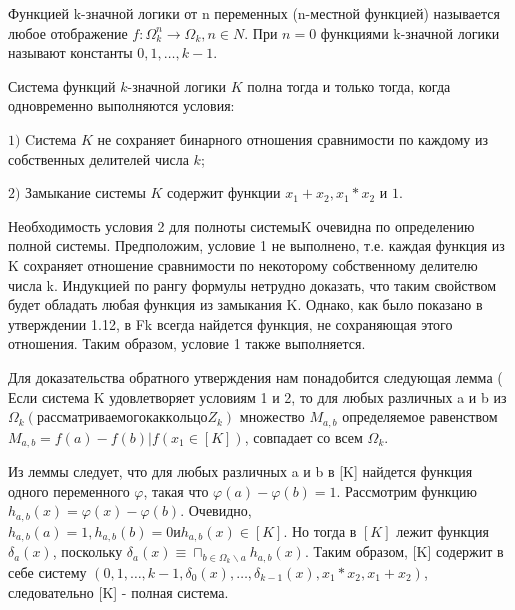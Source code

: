 \begin{defs}
Функцией k-значной логики от n переменных (n-местной функцией) называется любое отображение $f : \Omega_{k}^{n} \rightarrow  \Omega_{k}, n \in N $. При $n =0$ функциями k-значной логики называют константы $0,1,\ldots, k-1 $.
\end{defs}

\begin{proofs}[А. А. Нечаев]
Система функций $k$-значной логики $K$ полна тогда и только тогда, когда одновременно выполняются условия:

$1)$  Cистема $K$ не сохраняет бинарного отношения сравнимости по каждому из собственных делителей числа $k$;

$2)$ Замыкание системы $K$ содержит функции $x_{1} + x_{2}, x_{1}  * x_{2}$ и $1$.
	\begin{dokvo}
		 Необходимость условия 2 для полноты системыK очевидна по определению полной системы. Предположим, условие 1 не выполнено, т.е. каждая функция из K сохраняет отношение сравнимости по некоторому собственному делителю числа k. Индукцией по рангу формулы нетрудно доказать, что таким свойством будет обладать любая функция из замыкания K. Однако, как было показано в утверждении 1.12, в Fk всегда найдется функция, не сохраняющая этого отношения. Таким образом, условие 1 также выполняется.

		Для доказательства обратного утверждения нам понадобится следующая лемма ( Если система K удовлетворяет условиям 1 и 2, то для любых различных a и b из $\Omega_{k}  (рассматриваемого как кольцо Z_{k})$  множество $M_{a,b}$ определяемое равенством $ M_{a,b} = { f(a) - f(b) | f(x_{1} \in [K])}$, совпадает со всем $\Omega_{k}$.

		Из леммы следует, что для любых различных a и b в [K] найдется функция одного переменного $\varphi$, такая что $\varphi(a) - \varphi (b) = 1$.  Рассмотрим функцию $h_{a,b}(x) = \varphi(x) - \varphi(b)$. Очевидно, $h_{a,b}(a) = 1, h_{a,b}(b) = 0 и h_{a,b}(x) \in [K]$.  Но тогда в $[K]$ лежит функция $\delta_{a}(x)$,   поскольку $\delta_{a}(x) \equiv \sqcap_{b \in \Omega_{k} \backslash {a}} h_{a,b}(x)$. Таким образом, [K] содержит в себе систему $({0, 1, \ldots , k-1, \delta_{0}(x), \ldots , \delta_{k-1}(x), x_{1}*x_{2}, x_{1}+x_{2}})$, следовательно [K] - полная система.
	\end{dokvo}
\end{proofs}
\newpage
